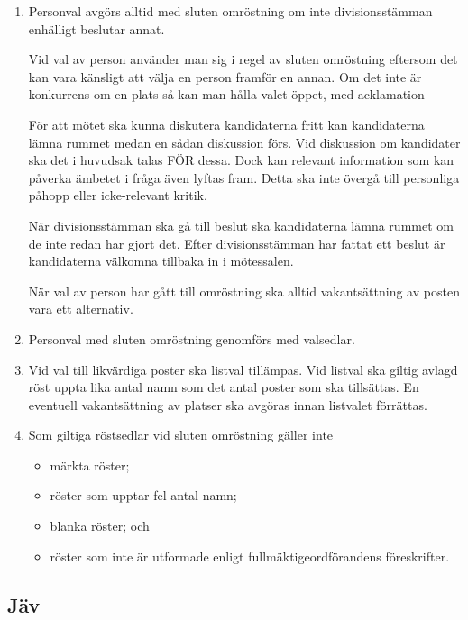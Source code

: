 \documentclass{dvd}
\begin{document}
	\begin{enumerate}[label=\arabic* §, ref=\arabic*]
		\item Personval avgörs alltid med sluten omröstning om inte divisionsstämman enhälligt beslutar annat.

		Vid val av person använder man sig i regel av sluten omröstning eftersom det kan vara känsligt att välja en person framför en annan.
		Om det inte är konkurrens om en plats så kan man hålla valet öppet, med acklamation

		För att mötet ska kunna diskutera kandidaterna fritt kan kandidaterna lämna rummet medan en sådan diskussion förs.
		Vid diskussion om kandidater ska det i huvudsak talas FÖR dessa.
		Dock kan relevant information som kan påverka ämbetet i fråga även lyftas fram.
		Detta ska inte övergå till personliga påhopp eller icke-relevant kritik.

		När divisionsstämman ska gå till beslut ska kandidaterna lämna rummet om de inte redan har gjort det.
		Efter divisionsstämman har fattat ett beslut är kandidaterna välkomna tillbaka in i mötessalen.

		När val av person har gått till omröstning ska alltid vakantsättning av posten vara ett alternativ.

		\item Personval med sluten omröstning genomförs med valsedlar.

		\item Vid val till likvärdiga poster ska listval tillämpas.
		Vid listval ska giltig avlagd röst uppta lika antal namn som det antal poster som ska tillsättas.
		En eventuell vakantsättning av platser ska avgöras innan listvalet förrättas.

		\item Som giltiga röstsedlar vid sluten omröstning gäller inte

		\begin{itemize}
			\item märkta röster;
			\item röster som upptar fel antal namn;
			\item blanka röster; och
			\item röster som inte är utformade enligt fullmäktigeordförandens föreskrifter.
		\end{itemize}
	\end{enumerate}

	\subsection{Jäv}
\end{document}
